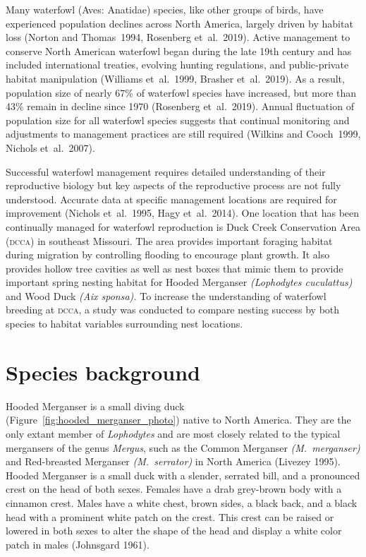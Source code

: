 
Many waterfowl (Aves: Anatidae) species, like other groups of birds, have experienced population declines across North America, largely driven by habitat loss (Norton and Thomas~1994, Rosenberg et~al.~2019).  Active management to conserve North American waterfowl began during the late 19th century and has included international treaties, evolving hunting regulations, and public-private habitat manipulation (Williams et~al.~1999, Brasher et~al.~2019). As a result, population size of nearly 67\% of waterfowl species have increased, but more than 43\% remain in decline since 1970 (Rosenberg et~al.~2019). Annual fluctuation of population size for all waterfowl species suggests that continual monitoring and adjustments to management practices are still required  (Wilkins and Cooch~1999, Nichols et~al.~2007). 

	Successful waterfowl management requires detailed understanding of their reproductive biology but key aspects of the reproductive process are not fully understood. Accurate data at specific management locations are required for improvement (Nichols et~al.~1995, Hagy et~al.~2014). One location that has been continually managed for waterfowl reproduction is Duck Creek Conservation Area \textsc{(dcca)} in southeast Missouri. The area provides important foraging habitat during migration by controlling flooding to encourage plant growth. It also provides hollow tree cavities as well as nest boxes that mimic them to provide important spring nesting habitat for Hooded Merganser \textit{(Lophodytes cuculattus)} and Wood Duck \textit{(Aix sponsa).} To increase the understanding of waterfowl breeding at \textsc{dcca}, a study was conducted to compare nesting success by both species to habitat variables surrounding nest locations.  




\section*{Species background}

Hooded Merganser is a small diving duck (Figure~\ref{fig:hooded_merganser_photo}) native to North America. They are the only extant member of \textit{Lophodytes} and are most closely related to the typical mergansers of the genus \textit{Mergus}, such as the Common Merganser \textit{(M.~merganser)} and Red-breasted Merganser \textit{(M.~serrator)} in North America (Livezey 1995). Hooded Merganser is a small duck with a slender, serrated bill, and a pronounced crest on the head of both sexes. Females have a drab grey-brown body with a cinnamon crest. Males have a white chest, brown sides, a black back, and a black head with a prominent white patch on the crest. This crest can be raised or lowered in both sexes to alter the shape of the head and display a white color patch in males (Johnsgard 1961). 

